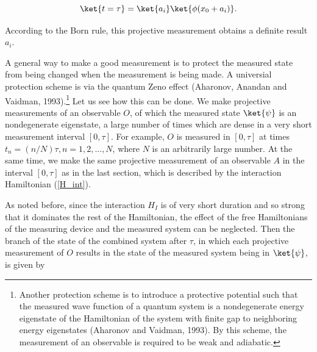 \begin{equation}
\ket{t=\tau} = \ket{a_i} \ket{\phi(x_0+a_i)}.
\label{PS}
\end{equation}

\noindent According to the Born rule, this projective measurement obtains a definite result $a_i$.


A general way to make a good measurement is to protect the measured state from being changed when the  measurement is being made. A universial protection scheme is via the quantum Zeno effect (Aharonov, Anandan and Vaidman, 1993).\footnote{Another protection scheme is to introduce a protective potential such that the measured wave function of a quantum system is a  nondegenerate energy eigenstate of the Hamiltonian of the system with finite gap to neighboring energy eigenstates (Aharonov and Vaidman, 1993). By this scheme, the measurement of an observable is required to be weak and adiabatic.}  
Let us see how this can be done. We make projective measurements of an observable $O$, of which the measured state $\ket{\psi}$ is an nondegenerate eigenstate, a large number of times which are dense in a very short measurement interval $[0,\tau]$. For example, $O$ is measured in $[0,\tau]$ at times $t_n=(n/N)\tau, n = 1,2, . . . ,N$, where $N$ is an arbitrarily large number.  At the same time, we make the same projective measurement of an observable $A$ in the interval $[0,\tau]$ as in the last section, which is described by the interaction Hamiltonian (\ref{H_int}). 


As noted before, since the interaction $H_I$  is of very short duration and so strong that it dominates the rest of the Hamiltonian, the effect of the free Hamiltonians of the measuring device and the measured system can be neglected. Then the branch of the state of the combined system after $\tau$, in which each projective measurement of $O$ results in the state of the measured system being in $\ket{\psi}$, is given by

